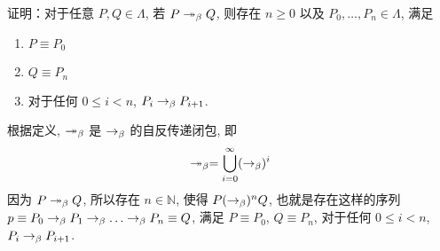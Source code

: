 \begin{problem}
证明：对于任意 $P, Q \in \Lambda$, 若 $P \twoheadrightarrow_\beta Q$, 则存在 $n \ge 0$ 以及 $P_0, \dots, P_n \in \Lambda$, 满足
\begin{enumerate}
\item $P \equiv P_0$
\item $Q \equiv P_n$
\item 对于任何 $0 \le i < n$, $P_i \rightarrow_\beta P_{i+1}$.
\end{enumerate}
\end{problem}

\begin{solution}
根据定义, $\twoheadrightarrow_\beta$ 是 $\rightarrow_\beta$ 的自反传递闭包, 即
\[
\twoheadrightarrow_\beta = \bigcup_{i=0}^\infty (\rightarrow_\beta)^i
\]
因为 $P \twoheadrightarrow_\beta Q$, 所以存在 $n \in \mathbb{N}$, 使得 $P (\rightarrow_\beta)^n Q$, 也就是存在这样的序列 $p \equiv P_0 \sreduceto P_1 \sreduceto \dots \sreduceto P_n \equiv Q$, 满足 $P \equiv P_0$, $Q \equiv P_n$, 对于任何 $0 \le i < n$, $P_i \rightarrow_\beta P_{i+1}$.
\end{solution}
